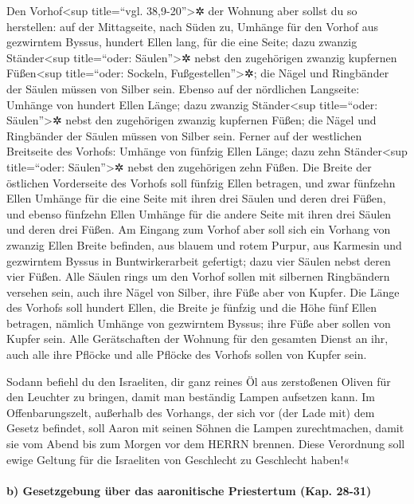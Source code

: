  Den Vorhof\textless sup title=``vgl.
38,9-20''\textgreater✲ der Wohnung aber sollst du so herstellen: auf der
Mittagseite, nach Süden zu, Umhänge für den Vorhof aus gezwirntem
Byssus, hundert Ellen lang, für die eine Seite;  dazu
zwanzig Ständer\textless sup title=``oder: Säulen''\textgreater✲ nebst
den zugehörigen zwanzig kupfernen Füßen\textless sup title=``oder:
Sockeln, Fußgestellen''\textgreater✲; die Nägel und Ringbänder der
Säulen müssen von Silber sein.  Ebenso auf der nördlichen
Langseite: Umhänge von hundert Ellen Länge; dazu zwanzig
Ständer\textless sup title=``oder: Säulen''\textgreater✲ nebst den
zugehörigen zwanzig kupfernen Füßen; die Nägel und Ringbänder der Säulen
müssen von Silber sein.  Ferner auf der westlichen
Breitseite des Vorhofs: Umhänge von fünfzig Ellen Länge; dazu zehn
Ständer\textless sup title=``oder: Säulen''\textgreater✲ nebst den
zugehörigen zehn Füßen.  Die Breite der östlichen
Vorderseite des Vorhofs soll fünfzig Ellen betragen,  und
zwar fünfzehn Ellen Umhänge für die eine Seite mit ihren drei Säulen und
deren drei Füßen,  und ebenso fünfzehn Ellen Umhänge für
die andere Seite mit ihren drei Säulen und deren drei Füßen.
 Am Eingang zum Vorhof aber soll sich ein Vorhang von
zwanzig Ellen Breite befinden, aus blauem und rotem Purpur, aus Karmesin
und gezwirntem Byssus in Buntwirkerarbeit gefertigt; dazu vier Säulen
nebst deren vier Füßen.  Alle Säulen rings um den Vorhof
sollen mit silbernen Ringbändern versehen sein, auch ihre Nägel von
Silber, ihre Füße aber von Kupfer.  Die Länge des Vorhofs
soll hundert Ellen, die Breite je fünfzig und die Höhe fünf Ellen
betragen, nämlich Umhänge von gezwirntem Byssus; ihre Füße aber sollen
von Kupfer sein.  Alle Gerätschaften der Wohnung für den
gesamten Dienst an ihr, auch alle ihre Pflöcke und alle Pflöcke des
Vorhofs sollen von Kupfer sein.

 Sodann befiehl du den Israeliten, dir ganz reines Öl aus
zerstoßenen Oliven für den Leuchter zu bringen, damit man beständig
Lampen aufsetzen kann.  Im Offenbarungszelt, außerhalb
des Vorhangs, der sich vor (der Lade mit) dem Gesetz befindet, soll
Aaron mit seinen Söhnen die Lampen zurechtmachen, damit sie vom Abend
bis zum Morgen vor dem HERRN brennen. Diese Verordnung soll ewige
Geltung für die Israeliten von Geschlecht zu Geschlecht haben!«

\hypertarget{b-gesetzgebung-uxfcber-das-aaronitische-priestertum-kap.-28-31}{%
\paragraph{b) Gesetzgebung über das aaronitische Priestertum (Kap.
28-31)}\label{b-gesetzgebung-uxfcber-das-aaronitische-priestertum-kap.-28-31}}

